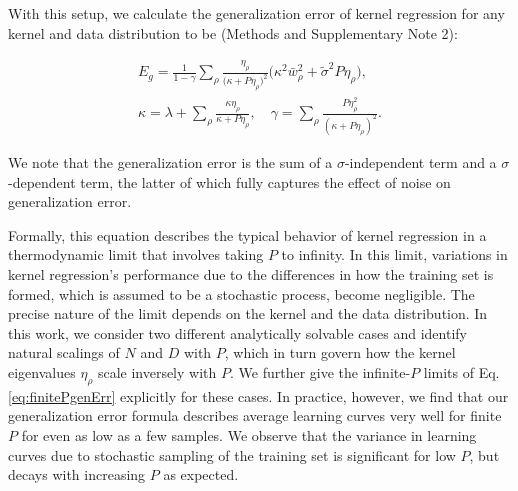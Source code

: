 \documentclass[11pt]{article}
\begin{document}
With this setup, we calculate the generalization error of kernel regression for any kernel and data distribution to be (Methods and Supplementary Note 2):    %
\begin{linenomath*}\begin{equation}\label{eq:finitePgenErr}
\begin{gathered}
    E_g = \frac{1}{1-\gamma}\sum_{\rho}\frac{\eta_\rho }{\big(\kappa+P\eta_\rho\big)^2}\big(\kappa^2\bar w_\rho^2+\tilde{\sigma}^2 P\eta_\rho\big), \\
    \kappa = \lambda  + \sum_\rho \frac{\kappa\eta_\rho}{\kappa+{P}\eta_\rho},\quad
    \gamma = \sum_\rho \frac{P\eta_\rho^2}{(\kappa+P\eta_\rho)^2}.
\end{gathered}
\end{equation}\end{linenomath*}
We note that the generalization error is the sum of a $\sigma$-independent term and a $\sigma$-dependent term, the latter of which fully captures the effect of noise on generalization error.

Formally, this equation describes the typical behavior of kernel regression in a thermodynamic limit that involves taking $P$ to infinity. In this limit, variations in kernel regression's performance due to the differences in how the training set is formed, which is assumed to be a stochastic process, become negligible. The precise nature of the limit depends on the kernel and the data distribution. In this work, we consider two different analytically solvable cases and identify natural scalings of $N$ and $D$ with $P$, which in turn govern how the kernel eigenvalues $\eta_\rho$ scale inversely with $P$. We further give the infinite-$P$ limits of Eq. \eqref{eq:finitePgenErr} explicitly for these cases. In practice, however, we find that our generalization error formula describes average learning curves very well for finite $P$ for even as low as a few samples. We observe that the variance in learning curves due to stochastic sampling of the training set is significant for low $P$, but decays with increasing $P$ as expected. 
\end{document}
